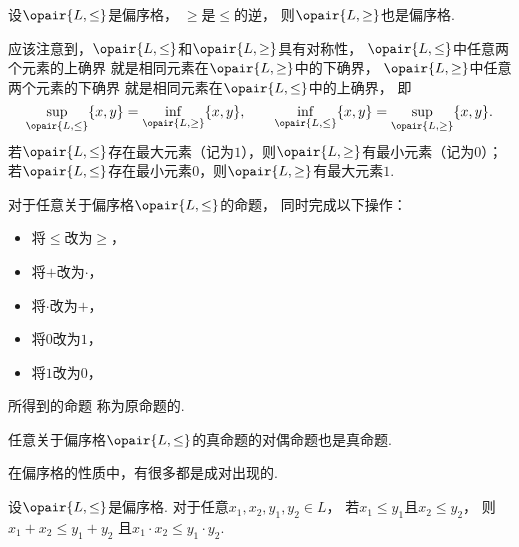 \begin{proposition}
设\(\opair{L,\leq}\)是偏序格，
\(\geq\)是\(\leq\)的逆，
则\(\opair{L,\geq}\)也是偏序格.
\end{proposition}

应该注意到，\(\opair{L,\leq}\)和\(\opair{L,\geq}\)具有对称性，
\(\opair{L,\leq}\)中任意两个元素的上确界
就是相同元素在\(\opair{L,\geq}\)中的下确界，
\(\opair{L,\geq}\)中任意两个元素的下确界
就是相同元素在\(\opair{L,\leq}\)中的上确界，
即\[
	\sup_{\opair{L,\leq}}\{x,y\}
	= \inf_{\opair{L,\geq}}\{x,y\},
	\qquad
	\inf_{\opair{L,\leq}}\{x,y\}
	= \sup_{\opair{L,\geq}}\{x,y\}.
\]
若\(\opair{L,\leq}\)存在最大元素（记为\(1\)），则\(\opair{L,\geq}\)有最小元素（记为\(0\)）；
若\(\opair{L,\leq}\)存在最小元素\(0\)，则\(\opair{L,\geq}\)有最大元素\(1\).

\begin{definition}
对于任意关于偏序格\(\opair{L,\leq}\)的命题，
同时完成以下操作：\begin{itemize}
	\item 将\(\leq\)改为\(\geq\)，
	\item 将\(+\)改为\(\cdot\)，
	\item 将\(\cdot\)改为\(+\)，
	\item 将\(0\)改为\(1\)，
	\item 将\(1\)改为\(0\)，
\end{itemize}
所得到的命题
称为原命题的.
\end{definition}

\begin{theorem}
任意关于偏序格\(\opair{L,\leq}\)的真命题的对偶命题也是真命题.
\end{theorem}

在偏序格的性质中，有很多都是成对出现的.
\begin{theorem}\label{theorem:格论.偏序格的保序性}
设\(\opair{L,\leq}\)是偏序格.
对于任意\(x_1,x_2,y_1,y_2 \in L\)，
若\(x_1 \leq y_1\)且\(x_2 \leq y_2\)，
则\(x_1 + x_2 \leq y_1 + y_2\)
且\(x_1 \cdot x_2 \leq y_1 \cdot y_2\).
\end{theorem}

